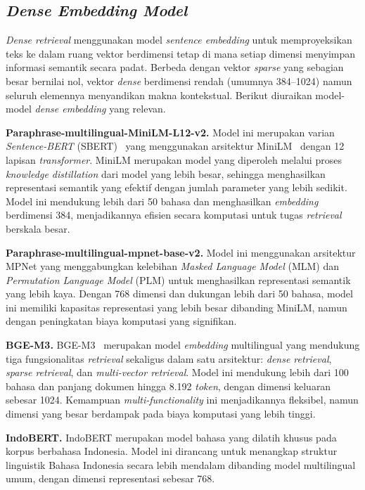 \subsection{\textit{Dense Embedding Model}}

\textit{Dense retrieval} menggunakan model \textit{sentence embedding} untuk memproyeksikan teks ke dalam ruang vektor berdimensi tetap di mana setiap dimensi menyimpan informasi semantik secara padat. Berbeda dengan vektor \textit{sparse} yang sebagian besar bernilai nol, vektor \textit{dense} berdimensi rendah (umumnya 384--1024) namun seluruh elemennya menyandikan makna kontekstual. Berikut diuraikan model-model \textit{dense embedding} yang relevan.

\textbf{Paraphrase-multilingual-MiniLM-L12-v2.} Model ini merupakan varian \textit{Sentence-BERT} (SBERT)~\cite{reimers2019sbert} yang menggunakan arsitektur MiniLM~\cite{wang2022minilm} dengan 12 lapisan \textit{transformer}. MiniLM merupakan model yang diperoleh melalui proses \textit{knowledge distillation} dari model yang lebih besar, sehingga menghasilkan representasi semantik yang efektif dengan jumlah parameter yang lebih sedikit. Model ini mendukung lebih dari 50 bahasa dan menghasilkan \textit{embedding} berdimensi 384, menjadikannya efisien secara komputasi untuk tugas \textit{retrieval} berskala besar.

\textbf{Paraphrase-multilingual-mpnet-base-v2.} Model ini menggunakan arsitektur MPNet yang menggabungkan kelebihan \textit{Masked Language Model} (MLM) dan \textit{Permutation Language Model} (PLM) untuk menghasilkan representasi semantik yang lebih kaya. Dengan 768 dimensi dan dukungan lebih dari 50 bahasa, model ini memiliki kapasitas representasi yang lebih besar dibanding MiniLM, namun dengan peningkatan biaya komputasi yang signifikan.

\textbf{BGE-M3.} BGE-M3~\cite{chen2024bge} merupakan model \textit{embedding} multilingual yang mendukung tiga fungsionalitas \textit{retrieval} sekaligus dalam satu arsitektur: \textit{dense retrieval}, \textit{sparse retrieval}, dan \textit{multi-vector retrieval}. Model ini mendukung lebih dari 100 bahasa dan panjang dokumen hingga 8.192 \textit{token}, dengan dimensi keluaran sebesar 1024. Kemampuan \textit{multi-functionality} ini menjadikannya fleksibel, namun dimensi yang besar berdampak pada biaya komputasi yang lebih tinggi.

\textbf{IndoBERT.} IndoBERT merupakan model bahasa yang dilatih khusus pada korpus berbahasa Indonesia. Model ini dirancang untuk menangkap struktur linguistik Bahasa Indonesia secara lebih mendalam dibanding model multilingual umum, dengan dimensi representasi sebesar 768.

